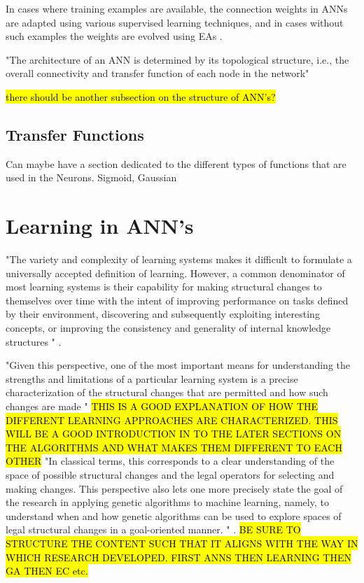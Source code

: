 In cases where training examples are available, the connection weights in ANNs are adapted using various supervised learning techniques, and in cases without such examples the weights are evolved using EAs \cite{dayhoff2001artificial,RefWorks:1}.


"The architecture of an ANN is determined by its topological structure, i.e., the overall connectivity and transfer function of each node in the network" \cite{XinYao1999}

\hl{there should be another subsection on the structure of ANN's?}

\subsection{Transfer Functions}
Can maybe have a section dedicated to the different types of functions that are used in the Neurons.
Sigmoid, Gaussian


\section{Learning in ANN's}


"The variety and complexity of learning systems makes it difficult to formulate a universally accepted definition of learning. However, a common denominator of most learning systems is their capability for making structural changes to themselves over time with the intent of improving performance on tasks defined by their environment, discovering and subsequently exploiting interesting concepts, or improving the consistency and generality of internal knowledge structures " \cite{de1988learning}.

"Given this perspective, one of the most important means for understanding the strengths and limitations of a particular learning system is a precise characterization of the structural changes that are permitted and how such changes are made " \cite{de1988learning} \hl{THIS IS A GOOD EXPLANATION OF HOW THE DIFFERENT LEARNING APPROACHES ARE CHARACTERIZED. THIS WILL BE A GOOD INTRODUCTION IN TO THE LATER SECTIONS ON THE ALGORITHMS AND WHAT MAKES THEM DIFFERENT TO EACH OTHER}
"In classical terms, this corresponds to a clear understanding of the space of possible structural changes and the legal operators for selecting and making changes. This perspective also lets one more precisely state the goal of the research in applying genetic algorithms to machine learning, namely, to understand when and how genetic algorithms can be used to explore spaces of legal structural changes in a goal-oriented manner. " \cite{de1988learning}.
\hl{BE SURE TO STRUCTURE THE CONTENT SUCH THAT IT ALIGNS WITH THE WAY IN WHICH RESEARCH DEVELOPED. FIRST ANNS THEN LEARNING THEN GA THEN EC etc.}




